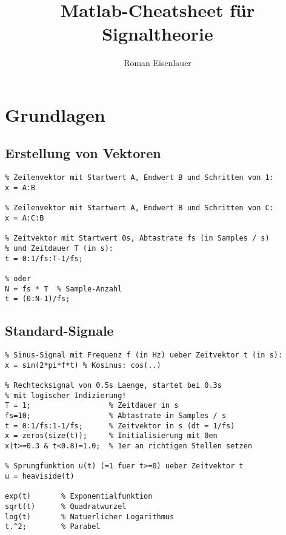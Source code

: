 \documentclass[threecolumn, german]{latex4ei/latex4ei_sheet}
\title{Matlab-Cheatsheet für Signaltheorie}
\author{Roman Eisenlauer}
\begin{document}
	\maketitle
	\section{Grundlagen}
	
	\begin{sectionbox}
		\subsection{Erstellung von Vektoren}
		\begin{lstlisting}
% Zeilenvektor mit Startwert A, Endwert B und Schritten von 1:
x = A:B

% Zeilenvektor mit Startwert A, Endwert B und Schritten von C:
x = A:C:B

% Zeitvektor mit Startwert 0s, Abtastrate fs (in Samples / s)
% und Zeitdauer T (in s):
t = 0:1/fs:T-1/fs;

% oder
N = fs * T  % Sample-Anzahl
t = (0:N-1)/fs;
		\end{lstlisting}
	\end{sectionbox}
	
	\begin{sectionbox}
		\subsection{Standard-Signale}
		\begin{lstlisting}
% Sinus-Signal mit Frequenz f (in Hz) ueber Zeitvektor t (in s):
x = sin(2*pi*f*t) % Kosinus: cos(..)

% Rechtecksignal von 0.5s Laenge, startet bei 0.3s
% mit logischer Indizierung!
T = 1;                  % Zeitdauer in s
fs=10;                  % Abtastrate in Samples / s
t = 0:1/fs:1-1/fs;      % Zeitvektor in s (dt = 1/fs)
x = zeros(size(t));     % Initialisierung mit 0en
x(t>=0.3 & t<0.8)=1.0;  % 1er an richtigen Stellen setzen

% Sprungfunktion u(t) (=1 fuer t>=0) ueber Zeitvektor t
u = heaviside(t)

exp(t)       % Exponentialfunktion
sqrt(t)      % Quadratwurzel
log(t)       % Natuerlicher Logarithmus
t.^2;        % Parabel
		\end{lstlisting}
	\end{sectionbox}
	
\end{document}
